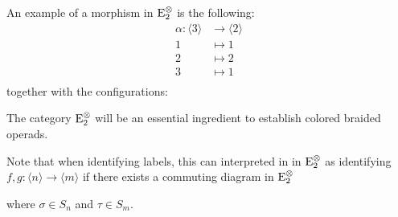 \begin{eg}
    An example of a morphism in $\operatorname{\operatorname{E}_2^{\otimes}}$ is the following:
    \begin{align*}
        \alpha \colon \langle 3 \rangle &\to \langle 2 \rangle \\ 1 &\mapsto 1 \\
        2 &\mapsto 2 \\
        3 &\mapsto 1 \\
    \end{align*}
    together with the configurations:
    \begin{center}
    \end{center}
\end{eg}
The category $\operatorname{\operatorname{E}_2^{\otimes}}$ will be an essential ingredient to establish colored braided
operads.

Note that when identifying labels, this can interpreted in
in $\operatorname{\operatorname{E}_2^{\otimes}}$ as identifying $f, g \colon \langle n \rangle \to \langle m \rangle$
if there exists a commuting diagram in $\operatorname{\operatorname{E}_2^{\otimes}}$
\begin{center}
\end{center}
where $\sigma \in S_n$ and $\tau \in S_m$.

